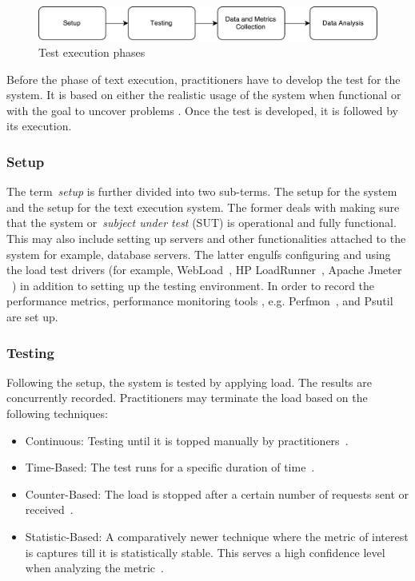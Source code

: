 \begin{figure}[thb!]
	\centering
	\includegraphics[width=1\textwidth]{figures/test_overview.pdf}
	\caption{Test execution phases}
	\label{fig:test_phases}
\end{figure}


Before the phase of text execution, practitioners have to develop the test for the system. It is based on either the realistic usage of the system when functional or with the goal to uncover problems \cite{jiang2015survey}.
Once the test is developed, it is followed by its execution. 



\subsubsection{Setup}


The term~\textit{setup} is further divided into two sub-terms. The setup for the system and the setup for the text execution system. The former deals with making sure that the system or~\textit{subject under test} (SUT) is operational and fully functional. This may also include setting up servers and other functionalities attached to the system for example, database servers. The latter engulfs configuring and using the load test drivers (for example, WebLoad~\cite{webload}, HP LoadRunner~\cite{loadrunner}, Apache Jmeter ~\cite{apachejmeter}) in addition to setting up the testing environment. In order to record the performance metrics, performance monitoring tools , e.g. Perfmon~\cite{perfmon}, and Psutil~\cite{psutil} are set up.

\subsubsection{Testing}

Following the setup, the system is tested by applying load. The results are concurrently recorded. Practitioners may terminate the load based on the following techniques:

\begin{itemize}
	\item Continuous: Testing until it is topped manually by practitioners~\cite{4017687}.
	\item Time-Based: The test runs for a specific duration of time~\cite{4017687}.
	\item Counter-Based: The load is stopped after a certain number of requests sent or received~\cite{4017687}.
	\item Statistic-Based: A comparatively newer technique where the metric of interest is captures till it is statistically stable. This serves a high confidence level when analyzing the metric~\cite{mansharamani2010performance,snellman2011towards}.
\end{itemize}

